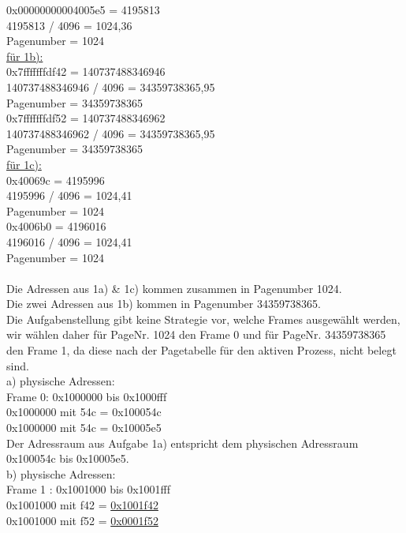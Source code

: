 \documentclass{ti2}
\begin{document}
0x00000000004005e5 = 4195813\\
4195813 / 4096 = 1024,36\\
Pagenumber = 1024\\

\underline{für 1b):}\\ 
0x7fffffffdf42 = 140737488346946\\
140737488346946 / 4096 = 34359738365,95\\
Pagenumber = 34359738365\\

0x7fffffffdf52 = 140737488346962\\
140737488346962 / 4096 = 34359738365,95\\
Pagenumber = 34359738365\\

\underline{für 1c):}\\
0x40069c = 4195996 \\
4195996 / 4096 = 1024,41\\
Pagenumber = 1024\\

0x4006b0 = 4196016\\
4196016 / 4096 = 1024,41\\
Pagenumber = 1024\\ \\

Die Adressen aus 1a) \& 1c) kommen zusammen in Pagenumber 1024.\\
Die zwei Adressen aus 1b) kommen in Pagenumber 34359738365.\\

Die Aufgabenstellung gibt keine Strategie vor, welche Frames ausgewählt werden, wir wählen daher für PageNr. 1024 den Frame 0 und für PageNr. 34359738365 den Frame 1, da diese nach der Pagetabelle für den aktiven Prozess, nicht belegt sind.\\

a) physische Adressen:\\
Frame 0: 0x1000000 bis 0x1000fff\\
0x1000000 mit 54c = 0x100054c\\
0x1000000 mit 54c = 0x10005e5\\

Der Adressraum aus Aufgabe 1a) entspricht dem physischen Adressraum 0x100054c bis 0x10005e5.\\

b) physische Adressen:\\
Frame 1 : 0x1001000 bis 0x1001fff\\
0x1001000 mit f42 = \underline{0x1001f42}\\
0x1001000 mit f52 = \underline{0x0001f52}\\
\end{document}
